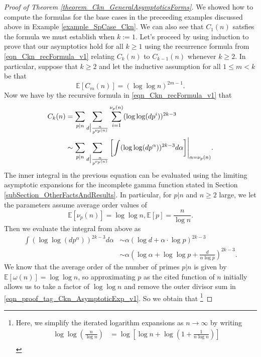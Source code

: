 \documentclass[11pt,reqno,a4letter]{article}
\numberwithin{figure}{section}
\numberwithin{table}{section}
\theoremstyle{plain}
\numberwithin{theorem}{section}
\theoremstyle{definition}
\newcommand{\NBRef}[1]{}
\begin{document}
\NBRef{A08-2020-04-26} 
\begin{proof}[Proof of Theorem \ref{theorem_Ckn_GeneralAsymptoticsForms}] 
\label{proofOf_theorem_Ckn_GeneralAsymptoticsForms} 
We showed how to compute the formulas for the base cases in the preceeding examples 
discussed above in Example \ref{example_SpCase_Ckn}. 
We can also see that $C_1(n)$ satsfies the formula we must establish when $k := 1$. 
Let's proceed by using induction to prove that our asymptotics hold for all 
$k \geq 1$ using the recurrence formula from 
\eqref{eqn_Ckn_recFormula_v1} 
relating $C_k(n)$ to $C_{k-1}(n)$ whenever $k \geq 2$. 
In particular, suppose that $k \geq 2$ and let the inductive assumption for all $1 \leq m < k$ 
be that 
\[
\mathbb{E}[C_m(n)] = (\log\log n)^{2m-1}. 
\]
Now we have by the recursive formula in \eqref{eqn_Ckn_recFormula_v1} that 
\begin{align} 
\notag 
C_k(n) & = \sum_{p|n} \sum_{d\bigr\rvert\frac{n}{p^{\nu_p(n)}}} \sum_{i=1}^{\nu_p(n)} (\log\log(dp^i))^{2k-3} \\ 
\label{eqn_proof_tag_Ckn_AsymptoticExp_v1} 
     & \sim \sum_{p|n} \sum_{d\bigr\rvert\frac{n}{p^{\nu_p(n)}}} \left[ 
     \int (\log\log(dp^{\alpha}))^{2k-3} d\alpha\right] \Biggr\rvert_{\alpha=\nu_p(n)}. 
\end{align} 
The inner integral in the previous equation can be evaluated using the 
limiting asymptotic expansions for the incomplete gamma function stated in 
Section \ref{subSection_OtherFactsAndResults}. 
In particular, for $p|n$ and $n \geq 2$ large, we let the parameters assume average order values of 
\[
\mathbb{E}[\nu_p(n)] = \log\log n, \mathbb{E}[p] = \frac{n}{\log n}. 
\]
Then we evaluate the integral from above as 
\begin{align*} 
\int (\log\log(dp^{\alpha}))^{2k-3} d\alpha & \sim \alpha \left( 
     \log d + \alpha \cdot \log p\right)^{2k-3} \\ 
     & \sim \alpha \left(\log \alpha + \log\log p + \frac{d}{\alpha \log p}\right)^{2k-3}. 
\end{align*} 
We know that the average order of the number of primes $p|n$ is given by 
$\mathbb{E}[\omega(n)] = \log\log n$, so approximating $p$ as the cited function of $n$ initially 
allows us to take a factor of $\log\log n$ and remove the outer divisor sum in 
\eqref{eqn_proof_tag_Ckn_AsymptoticExp_v1}. So we obtain that \footnote{ 
     Here, we simplify the iterated logarithm expansions as $n \rightarrow \infty$ by writing 
     \begin{align*} 
     \log\log\left(\frac{n}{\log n}\right) & = \log\left[\log n + \log\left(1 + \frac{1}{n\log n}\right)\right] \\ 

\end{align*}}
\end{proof}
\end{document}
